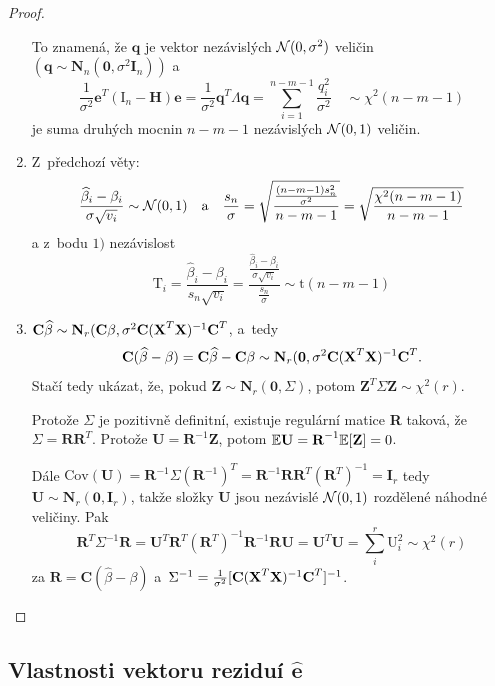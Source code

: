 \begin{proof}
\begin{enumerate}
\begin{theorem}
\end{theorem}
To znamená, že $\textbf{q}$ je vektor nezávislých $\mathcal{N}(0,\sigma^2)$ veličin $(\textbf{q} \sim \textbf{N}_n (\textbf{0}, \sigma^2 \textbf{I}_n))$ a
 $$ \frac{1}{\sigma^2} \textbf{e}^T (\text{I}_n - \textbf{H}) \textbf{e} = \frac{1}{\sigma^2} \textbf{q}^T \Lambda \textbf{q} = \sum_{i = 1}^{n-m-1}\frac{q_i^2}{\sigma^2} \quad \sim \chi^2 (n - m - 1) $$
je suma druhých mocnin $n-m-1$ nezávislých $\mathcal{N}(0,1)$ veličin.
\item Z~předchozí věty:
 $$
  \frac{\widehat{\beta}_i - \beta_i}{\sigma \sqrt{v_i}} \sim \mathcal{N}(0,1) \quad \text{a} \quad \frac{s_n}{\sigma} = \sqrt{\frac{\frac{(n-m-1) s_n^2}{\sigma^2}}{n-m-1}} = \sqrt{\frac{\chi^2(n-m-1)}{n-m-1}}
 $$
a z~bodu $1)$ nezávislost
 $$
  \text{T}_i = \frac{\widehat{\beta}_i - \beta_i}{s_n \sqrt{v_i}} = \frac{\frac{\widehat{\beta}_i - \beta_i}{\sigma \sqrt{v_i}}}{\frac{s_n}{\sigma}} \sim \mathrm{t}(n-m-1)
 $$
\item
 $\textbf{C} \widehat{\beta} \sim \textbf{N}_r (\textbf{C} \beta, \sigma^2 \textbf{C} (\textbf{X}^T \textbf{X})^{-1} \textbf{C}^T$, a~tedy
 $$ \textbf{C} (\widehat{\beta} - \beta) = \textbf{C}\widehat{\beta} - \textbf{C} \beta \sim \textbf{N}_r (\textbf{0}, \sigma^2 \textbf{C} (\textbf{X}^T \textbf{X})^{-1} \textbf{C}^T. $$
Stačí tedy ukázat, že, pokud $\textbf{Z} \sim \textbf{N}_r (\textbf{0}, \Sigma)$, potom $\textbf{Z}^T \Sigma \textbf{Z} \sim \chi^2(r)$.

Protože $\Sigma$ je pozitivně definitní, existuje regulární matice \textbf{R} taková, že $\Sigma = \textbf{RR}^T$. Protože $\textbf{U} = \textbf{R}^{-1} \textbf{Z}$, potom $\mathbb{E} \textbf{U} = \textbf{R}^{-1} \mathbb{E} [\textbf{Z}] = 0$.

Dále $\text{Cov}(\textbf{U}) = \textbf{R}^{-1} \Sigma (\textbf{R}^{-1})^T = \textbf{R}^{-1} \textbf{RR}^T (\textbf{R}^T)^{-1} = \textbf{I}_r$ tedy $\textbf{U} \sim \textbf{N}_r (\textbf{0}, \textbf{I}_r)$, takže složky \textbf{U} jsou nezávislé $\mathcal{N}(0,1)$ rozdělené náhodné veličiny. Pak
 $$ \textbf{R}^T \Sigma^{-1} \textbf{R} = \textbf{U}^T \textbf{R}^T (\textbf{R}^T)^{-1} \textbf{R}^{-1} \textbf{R} \textbf{U} = \textbf{U}^T \textbf{U} = \sum_i^r \text{U}_i^2 \sim \chi^2(r) $$
za $\textbf{R} = \textbf{C} (\widehat{\beta} - \beta)$ a~$\Sigma^{-1} = \frac{1}{\sigma^2} [\textbf{C} (\textbf{X}^T \textbf{X})^{-1} \textbf{C}^T]^{-1}$.

\end{enumerate}
\end{proof}

\subsection{Vlastnosti vektoru reziduí $\widehat{\textbf{e}}$ }

